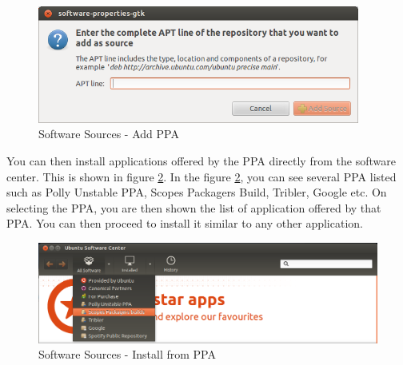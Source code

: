 \begin{figure}[h!]	
	\centering
	\includegraphics[width=300pt]{./images/applications/software-source-ppa-add.png}
	\caption{Software Sources - Add PPA}	
	\label{fig:software-source-ppa-add}		
\end{figure}

\par \noindent You can then install applications offered by the PPA directly from the software center. This is shown in figure \ref{fig:software-source-ppa-installapp}. In the figure \ref{fig:software-source-ppa-installapp}, you can see several PPA listed such as Polly Unstable PPA, Scopes Packagers Build, Tribler, Google etc. On selecting the PPA, you are then shown the list of application offered by that PPA. You can then proceed to install it similar to any other application.\\

\begin{figure}[h!]	
	\centering
	\includegraphics[width=350pt]{./images/applications/software-source-ppa-installapp.png}
	\caption{Software Sources - Install from PPA}	
	\label{fig:software-source-ppa-installapp}		
\end{figure}

\par \noindent {} \\

